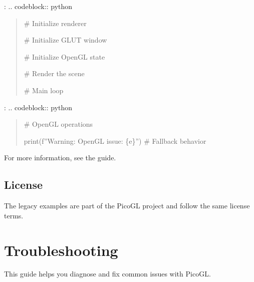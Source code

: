 \documentclass[a4paper,10pt,english,openany,oneside]{sphinxmanual}
\begin{document}
\sphinxAtStartPar
{}:
.. code\sphinxhyphen{}block:: python
\begin{quote}
\begin{description}
\begin{description}
\sphinxAtStartPar
\# Initialize renderer

\sphinxAtStartPar
\# Initialize GLUT window

\sphinxAtStartPar
\# Initialize OpenGL state

\sphinxAtStartPar
\# Render the scene

\sphinxAtStartPar
\# Main loop

\end{description}

\end{description}
\end{quote}

\sphinxAtStartPar
{}:
.. code\sphinxhyphen{}block:: python
\begin{quote}
\begin{description}
\sphinxAtStartPar
\# OpenGL operations

\sphinxAtStartPar
print(f”Warning: OpenGL issue: \{e\}”)
\# Fallback behavior

\end{description}
\end{quote}

\sphinxAtStartPar
For more information, see the {\hyperref[\detokenize{contributing::doc}]{}} guide.


\subsection{License}
\label{\detokenize{legacy_examples:license}}
\sphinxAtStartPar
The legacy examples are part of the PicoGL project and follow the same license terms.

\sphinxstepscope


\section{Troubleshooting}
\label{\detokenize{troubleshooting:troubleshooting}}\label{\detokenize{troubleshooting::doc}}
\sphinxAtStartPar
This guide helps you diagnose and fix common issues with PicoGL.
\end{document}
